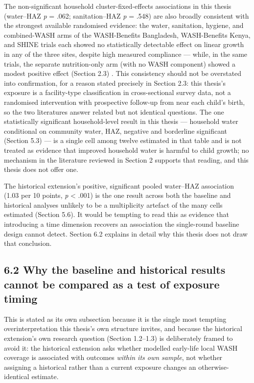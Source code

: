 The non-significant household cluster-fixed-effects associations in this thesis (water--HAZ \textit{p} = .062; sanitation--HAZ \textit{p} = .548) are also broadly consistent with the strongest available randomised evidence: the water, sanitation, hygiene, and combined-WASH arms of the WASH-Benefits Bangladesh, WASH-Benefits Kenya, and SHINE trials each showed no statistically detectable effect on linear growth in any of the three sites, despite high measured compliance --- while, in the same trials, the separate nutrition-only arm (with no WASH component) showed a modest positive effect (Section 2.3) \parencite{Cumming2019}. This consistency should not be overstated into confirmation, for a reason stated precisely in Section 2.3: this thesis's exposure is a facility-type classification in cross-sectional survey data, not a randomised intervention with prospective follow-up from near each child's birth, so the two literatures answer related but not identical questions. The one statistically significant household-level result in this thesis --- household water conditional on community water, HAZ, negative and borderline significant (Section 5.3) --- is a single cell among twelve estimated in that table and is not treated as evidence that improved household water is harmful to child growth; no mechanism in the literature reviewed in Section 2 supports that reading, and this thesis does not offer one.

The historical extension's positive, significant pooled water--HAZ association (1.03 per 10 points, \textit{p} < .001) is the one result across both the baseline and historical analyses unlikely to be a multiplicity artefact of the many cells estimated (Section 5.6). It would be tempting to read this as evidence that introducing a time dimension recovers an association the single-round baseline design cannot detect. Section 6.2 explains in detail why this thesis does not draw that conclusion.

\subsection*{6.2 Why the baseline and historical results cannot be compared as a test of exposure timing}

This is stated as its own subsection because it is the single most tempting overinterpretation this thesis's own structure invites, and because the historical extension's own research question (Section 1.2--1.3) is deliberately framed to avoid it: the historical extension asks whether modelled early-life local WASH coverage is associated with outcomes \textit{within its own sample}, not whether assigning a historical rather than a current exposure changes an otherwise-identical estimate.

